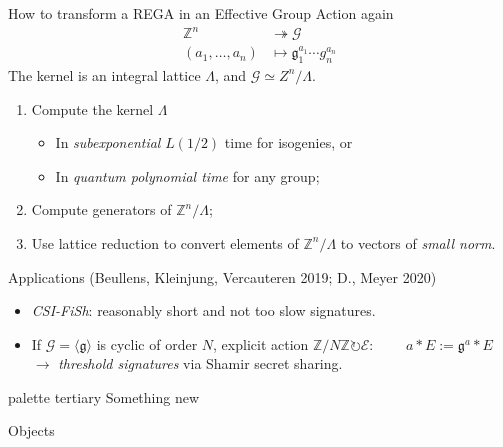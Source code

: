 \documentclass[aspectratio=169]{beamer}
\newcommand{\Z}{ℤ}
\newcommand{\g}{\mathfrak{g}}
\newcommand{\G}{\mathcal{G}}
\newcommand{\E}{\mathcal{E}}
\begin{document}
\begin{frame}{How to transform a REGA in an Effective Group Action again}
  \begin{align*}
    \Z^n &\twoheadrightarrow \G\\
    (a_1,\ldots,a_n)&\mapsto \g_1^{a_1}\cdots g_n^{a_n}
  \end{align*}
  The kernel is an integral lattice $\Lambda$, and
  \emph{$\G \simeq Z^n/\Lambda$}.

  \begin{enumerate}
  \item Compute the kernel $\Lambda$
    \begin{itemize}
    \item In \emph{subexponential} $L(1/2)$ time for isogenies, or
    \item In \emph{quantum polynomial time} for any group;
    \end{itemize}
  \item Compute generators of $\Z^n/\Lambda$;
  \item Use lattice reduction to convert elements of $\Z^n/\Lambda$ to
    vectors of \emph{small norm}.
  \end{enumerate}

  \pause
  \begin{block}{Applications \small(Beullens, Kleinjung, Vercauteren 2019; D., Meyer 2020)}
    \begin{itemize}
    \item \emph{CSI-FiSh}: reasonably short and not too slow signatures.
    \item If \emph{$\G=\langle\g\rangle$} is cyclic of order
      \emph{$N$}, explicit action \emph{$\Z/N\Z\circlearrowright\E$}:
      $\qquad a * E := \g^a * E$\\
      $\to$ \emph{threshold signatures} via Shamir secret sharing.
    \end{itemize}
  \end{block}
\end{frame}


\begin{frame}[plain]
  \begin{beamercolorbox}[sep=0.1px,center,wd=\paperwidth,sep=0.5\paperheight]{palette tertiary}
    \Huge\centering Something new
  \end{beamercolorbox}
\end{frame}


\begin{frame}{Objects }
  \centering
\end{frame}
\end{document}
